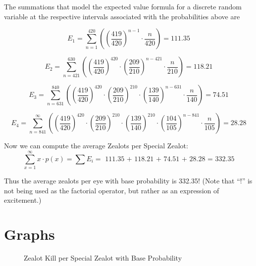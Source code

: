\documentclass{article}
\begin{document}
The summations that model the expected value formula for a discrete random variable at the respective intervals associated with the probabilities above are

\[
E_1 = \sum_{n=1}^{420}\left(\left(\frac{419}{420}\right)^{n-1}\cdot\frac{n}{420}\right) = 111.35
\]

\vspace{3mm}

\[
E_2 = \sum_{n=421}^{630}\left(\left(\frac{419}{420}\right)^{420}\cdot\left(\frac{209}{210}\right)^{n-421}\cdot\frac{n}{210}\right) = 118.21
\]

\[
E_3 = \sum_{n=631}^{840}\left(\left(\frac{419}{420}\right)^{420}\cdot\left(\frac{209}{210}\right)^{210}\cdot\left(\frac{139}{140}\right)^{n-631}\cdot\frac{n}{140}\right) = 74.51
\]

\[
E_4 = \sum_{n=841}^{\infty}\left(\left(\frac{419}{420}\right)^{420}\cdot\left(\frac{209}{210}\right)^{210}\cdot\left(\frac{139}{140}\right)^{210}\cdot\left(\frac{104}{105}\right)^{n-841}\cdot\frac{n}{105}\right) = 28.28
\]

Now we can compute the average Zealots per Special Zealot:
\[
\sum_{x=1}^{\infty} x \cdot p(x) = \sum E_i = \text{ 111.35 + 118.21 + 74.51 + 28.28 = 332.35}
\]

Thus the average zealots per eye with base probability is 332.35! (Note that ``!''  is not being used as the factorial operator, but rather as an expression of excitement.)

\vspace{3mm}

\section{Graphs}

\begin{figure}[H]
\caption{Zealot Kill per Special Zealot with Base Probability}
\centering
{}
\end{figure}
\end{document}
